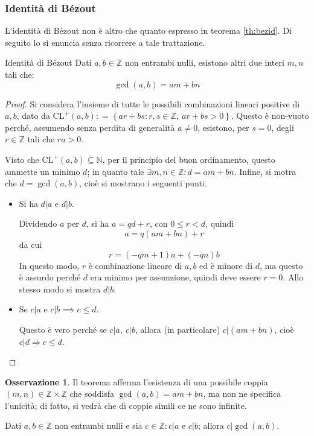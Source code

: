 \documentclass[11pt, a4paper]{scrartcl}
\theoremstyle{definition}
\numberwithin{esempio}{section}
\theoremstyle{definition}
\newtheorem{obs}{Osservazione}
\numberwithin{obs}{section}
\numberwithin{nota}{section}
\numberwithin{equation}{subsection}
\begin{document}
\subsubsection{Identit\`a di B\'ezout}
L'identit\`a di B\'ezout non \`e altro che quanto espresso in teorema \ref{th:bezid}. Di seguito lo si enuncia senza ricorrere a tale trattazione. 
\begin{teorema}
	{Identit\`a di B\'ezout}{}
	Dati $a,b \in \mathbb{Z}$ non entrambi nulli, esistono altri due interi $m,n$ tali che:
	\[
	\operatorname{gcd} (a,b) = am +  bn
	\] 
\begin{proof}
	Si considera l'insieme di tutte le possibili combinazioni lineari positive di $a,b$, dato da $\mathrm{CL} ^+(a,b) : = \left\{ ar+ bs : r, s \in \mathbb{Z} , \ ar + bs > 0 \right\} $. Questo \`e non-vuoto perch\'e, assumendo senza perdita di generalit\`a $a\neq 0$, esistono, per $s =0 $, degli $r\in \mathbb{Z}$ tali che $ra >0 $.

	Visto che $\mathrm{CL} ^+(a,b) \subseteq \mathbb{N}$, per il principio del buon ordinamento, questo ammette un minimo $d$; in quanto tale $\exists m,n \in \mathbb{Z}:d = am + bn$. 
	Infine, si motra che $d = \operatorname{gcd} (a,b)$, cio\`e si mostrano i seguenti punti.
	\begin{itemize}
		\item Si ha $d|a$ e $d|b$.

			Dividendo $a$ per $d$, si ha $a = qd +r$, con $0\le r < d$, quindi
			\[
			a = q ( am +  bn) + r
			\] 
			da cui 
			\[
			r = (-qm + 1) a + (-qn) b
			\] 
			In questo modo, $r$ \`e combinazione lineare di $a,b$ ed \`e minore di $d$, ma questo \`e assurdo perch\'e $d $ era minimo per assunzione, quindi deve essere $r= 0$. Allo stesso modo si mostra $d | b$.
		\item Se $c|a$ e $c|b \implies c \le d$.

			Questo \`e vero perch\'e se $c|a, \ c|b$, allora (in particolare) $c | (am + bn) $, cio\`e $ c | d \Rightarrow c\le d$.
	\end{itemize}
\end{proof}
\end{teorema}
\begin{obs}
	Il teorema afferma l'esistenza di una possibile coppia $(m,n) \in \mathbb{Z} \times \mathbb{Z}$ che soddisfa $\operatorname{gcd} (a,b) = am + bn$, ma non ne specifica l'unicit\`a; di fatto, si vedr\`a che di coppie simili ce ne sono infinite.
\end{obs}
\begin{corollario}
	{}{}
	Dati $a,b \in \mathbb{Z}$ non entrambi nulli e sia $c\in \mathbb{Z} : c|a$ e $c|b$; allora $c | \operatorname{gcd}(a,b) $. 
\end{corollario}
\end{document}

